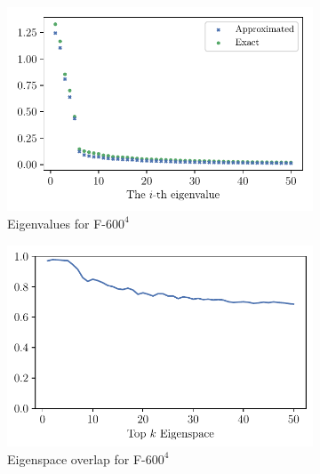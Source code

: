 \begin{figure}[H]
\begin{subfigure}[t]{0.5\textwidth}
        \includegraphics[width=\textwidth]{Appendix_Figures/Full_hessian/newplots/eigenval_fc4_600.pdf}
        \caption{Eigenvalues for F-$600^4$}
    \end{subfigure}%
    \begin{subfigure}[t]{0.5\textwidth}
        \centering
        \captionsetup{justification=centering}
        \includegraphics[width=\textwidth]{Appendix_Figures/Full_hessian/newplots/eigenvec_fc4_600.pdf}
        \caption{Eigenspace overlap for F-$600^4$}
    \end{subfigure}\\
    \begin{subfigure}[t]{0.5\textwidth}
        \centering
        \captionsetup{justification=centering}

\end{subfigure}
\end{figure}
